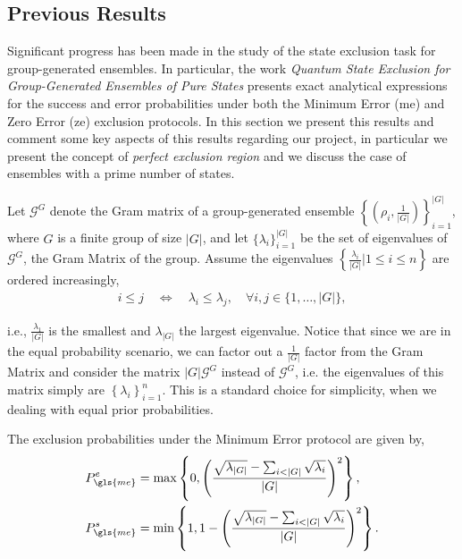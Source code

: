 \documentclass[12pt,letterpaper]{article}
\begin{document}
\subsection{Previous Results}\label{sectionPreviousResults}

\hspace{20pt}Significant progress has been made in the study of the state exclusion task for group-generated ensembles. In particular, the work \emph{Quantum State Exclusion for Group-Generated Ensembles of Pure States}\cite{MainPaper} presents exact analytical expressions for the success and error probabilities under both the Minimum Error (\gls{me}) and Zero Error (\gls{ze}) exclusion protocols. In this section we present this results and comment some key aspects of this results regarding our project, in particular we present the concept of \emph{perfect exclusion region} and we discuss the case of ensembles with a prime number of states.

Let $\mathcal{G}^G$ denote the Gram matrix of a group-generated ensemble $\left\{ \left( \rho_i, \frac{1}{|G|} \right) \right\}_{i=1}^{|G|}$, where $G$ is a finite group of size $|G|$, and let $\{\lambda_i\}_{i=1}^{|G|}$ be the set of eigenvalues of $\mathcal{G}^G$, the Gram Matrix of the group. Assume the eigenvalues $\left\{\frac{\lambda_i}{|G|}|1\leq i \leq n\right\}$ are ordered increasingly,
\begin{align*}
	i \leq j \quad \Leftrightarrow \quad \lambda_i \leq \lambda_j, \quad \forall i,j \in \{1, \dots, |G|\},
\end{align*}

i.e., $\frac{\lambda_1}{|G|}$ is the smallest and $\lambda_{|G|}$ the largest eigenvalue. Notice that since we are in the equal probability scenario, we can factor out a $\frac{1}{|G|}$ factor from the Gram Matrix and consider the matrix $|G|\mathcal{G}^G$ instead of $\mathcal{G}^G$, i.e. the eigenvalues of this matrix simply are $\left\{\lambda_i\right\}_{i=1}^n$. This is a standard choice for simplicity, when we dealing with equal prior probabilities.

The exclusion probabilities under the Minimum Error protocol are given by,
\begin{align*}
	P_{\gls{me}}^e &= \max\left\{ 0, \left( \frac{ \sqrt{\lambda_{|G|}} - \sum_{i<|G|} \sqrt{\lambda_i} }{|G|} \right)^2 \right\}, \\
	P_{\gls{me}}^s &= \min\left\{ 1, 1 - \left( \frac{ \sqrt{\lambda_{|G|}} - \sum_{i<|G|} \sqrt{\lambda_i} }{|G|} \right)^2 \right\}.
\end{align*}
\end{document}
